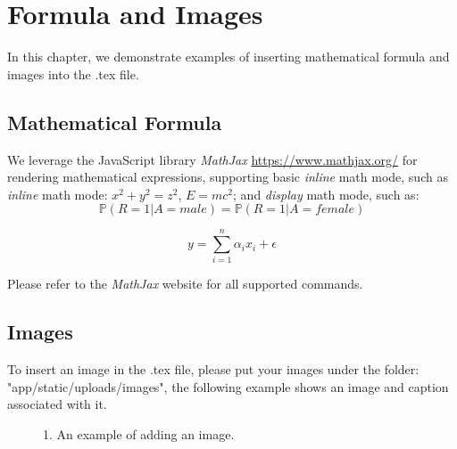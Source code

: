 \section{Formula and Images}

\par In this chapter, we demonstrate examples of inserting mathematical formula and images into the .tex file. 

\subsection{Mathematical Formula}

We leverage the JavaScript library \emph{MathJax} \url{https://www.mathjax.org/} for rendering mathematical expressions, supporting basic \emph{inline} math mode, such as \emph{inline} math mode: $x^2 + y^2 = z^2$, $E=mc^2$;
and \emph{display} math mode, such as:
$$\mathbb{P}(R =1 |A = male) = \mathbb{P}(R =1 |A = female)$$ 

$$y = \sum_{i=1}^{n}\alpha_i x_i+\epsilon$$

Please refer to the \emph{MathJax} website for all supported commands.

\subsection{Images}
To insert an image in the .tex file, please put your images under the folder: "app/static/uploads/images", 
the following example shows an image and caption associated with it.

\begin{figure}
    \caption{1. An example of adding an image.}
\end{figure}

